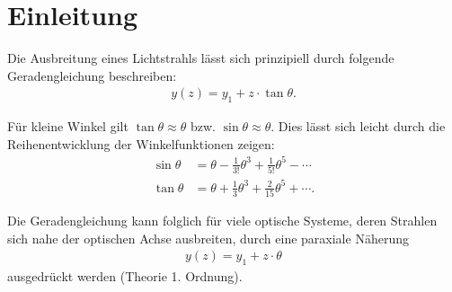 \section{Einleitung}

Die Ausbreitung eines Lichtstrahls lässt sich prinzipiell durch folgende Geradengleichung beschreiben:
\begin{align*}
y(z)=y_1 + z \cdot \tan \theta.
\end{align*}

Für kleine Winkel gilt $\tan\theta \approx \theta$ bzw. $\sin \theta \approx \theta $. Dies lässt sich leicht durch die Reihenentwicklung der Winkelfunktionen zeigen:
\begin{align*}
\sin \theta &= \theta - \frac{1}{3!}\theta^3 + \frac{1}{5!}\theta^5 - \cdots \\
\tan \theta &= \theta + \frac{1}{3}\theta^3 + \frac{2}{15}\theta^5 + \cdots.
\end{align*}

Die Geradengleichung kann folglich für viele optische Systeme, deren Strahlen sich nahe der optischen Achse ausbreiten, durch eine paraxiale Näherung 
\begin{align*}
y(z)=y_1 + z \cdot \theta
\end{align*}
ausgedrückt werden (Theorie 1. Ordnung).

